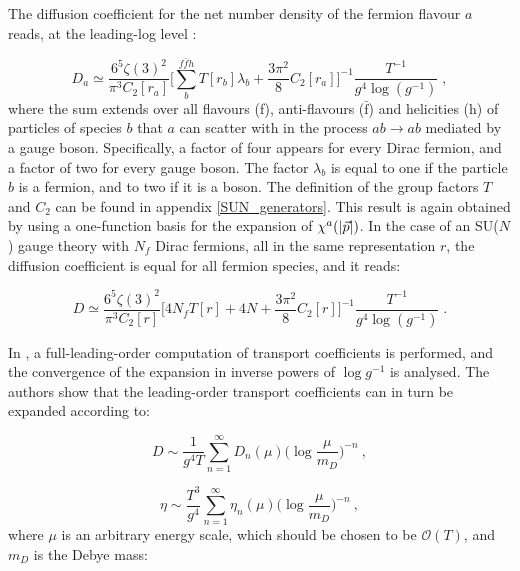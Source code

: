 The diffusion coefficient for the net number density of the fermion flavour $a$ reads, at the leading-log level \cite{Arnold:2000dr}:

\begin{equation}
D_a \simeq \frac{6^5 \zeta(3)^2}{\pi^3 C_2[r_a]} \biggl[ \sum_b^{f \bar{f} h} T[r_b] \lambda_b + \frac{3 \pi^2}{8} 
C_2[r_a] \biggr]^{-1}  \frac{T^{-1}}{g^4 \log(g^{-1})}\;, 
\label{diff_coeff}
\end{equation}
%
where the sum extends over all flavours (f), anti-flavours ($\bar{\mathrm f}$) and helicities (h) of particles of species $b$ that $a$ can scatter with in the process $ab \to ab$ mediated by a gauge boson. Specifically, a factor of four appears for every Dirac fermion, and a factor of two for every gauge boson. The factor $\lambda_b$  is  equal to one if the particle $b$ is a fermion, and to two if it is a boson. The definition of the group factors $T$ and $C_2$ can be found in appendix \ref{SUN_generators}. This result is again obtained by using a one-function basis for the expansion of $\chi^a(\abs{\vec p})$. In the case of an SU($N$) gauge theory with $N_f$ Dirac fermions, all in the same representation $r$, the diffusion coefficient is equal for all fermion species, and it reads:

\begin{equation}
D \simeq \frac{6^5 \zeta(3)^2}{\pi^3 C_2[r]} \biggl[ 4 N_f T[r] + 4 N + \frac{3 \pi^2}{8} C_2[r] \biggr]^{-1} 
 \frac{T^{-1}}{g^4\log(g^{-1})} \;.
\end{equation}

In \cite{Arnold:2003zc}, a full-leading-order computation of transport coefficients is performed, and the convergence of the expansion in inverse powers of $\log g^{-1}$ is analysed. The authors show that the leading-order transport coefficients can in turn be expanded according to:

\begin{equation}
D \sim \frac{1}{g^4 T} \sum_{n=1}^{\infty} D_n(\mu) \biggl( \log\frac{\mu}{m_D}\biggr)^{-n} \: ,
\label{D_series}
\end{equation}

\begin{equation}
\eta \sim \frac{T^3}{g^4} \sum_{n=1}^{\infty} \eta_n(\mu) \biggl( \log\frac{\mu}{m_D}\biggr)^{-n} \: ,
\label{eta_series}
\end{equation}
%
where $\mu$ is an arbitrary energy scale, which should be chosen to be $\mathcal O(T)$, and $m_D$ is the Debye mass:

